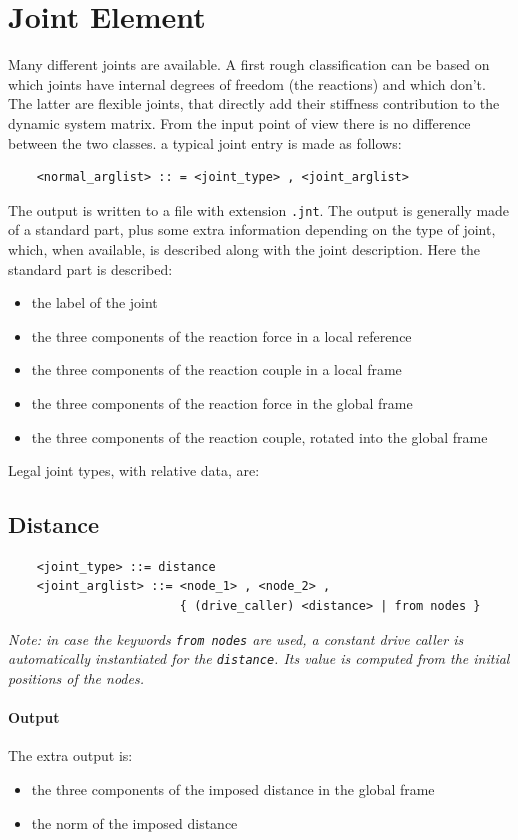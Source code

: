 \documentclass[10pt,dvips]{report}
\begin{document}
\section{Joint Element}
Many different joints are available. A first rough classification can be
based on which joints have internal degrees of freedom (the reactions) and
which don't. The latter are flexible joints, that directly add their
stiffness contribution to the dynamic system matrix. From the input point
of view there is no difference between the two classes.
a typical joint entry is made as follows:
\begin{verbatim}
    <normal_arglist> :: = <joint_type> , <joint_arglist>
\end{verbatim}
The output is written to a file with extension {\tt .jnt}.
The output is generally made of a standard part, plus some extra information
depending on the type of joint, which, when available, is described along
with the joint description.
Here the standard part is described:
\begin{itemize}
    \item the label of the joint
    \item the three components of the reaction force in a local reference
    \item the three components of the reaction couple in a local frame
    \item the three components of the reaction force in the global frame
    \item the three components of the reaction couple, rotated into the
          global frame
\end{itemize}
Legal joint types, with relative data, are:


\subsection{Distance}
\begin{verbatim}
    <joint_type> ::= distance 
    <joint_arglist> ::= <node_1> , <node_2> ,
                        { (drive_caller) <distance> | from nodes }
\end{verbatim}

\noindent
{\em
    Note: in case the keywords {\tt from nodes} are used, a constant drive
    caller is automatically instantiated for the {\tt distance}. 
    Its value is computed from the initial positions of the nodes.
}

\paragraph{Output}
The extra output is:
\begin{itemize}
    \item the three components of the imposed distance in the global frame
    \item the norm of the imposed distance
\end{itemize}
\end{document}

